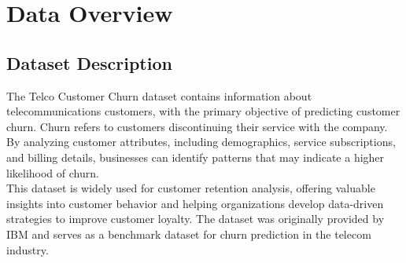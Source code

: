 \section{Data Overview}
\subsection{Dataset Description}
The Telco Customer Churn dataset contains information about telecommunications customers, with the primary objective of predicting customer churn. Churn refers to customers discontinuing their service with the company. By analyzing customer attributes, including demographics, service subscriptions, and billing details, businesses can identify patterns that may indicate a higher likelihood of churn.\\

This dataset is widely used for customer retention analysis, offering valuable insights into customer behavior and helping organizations develop data-driven strategies to improve customer loyalty. The dataset was originally provided by IBM and serves as a benchmark dataset for churn prediction in the telecom industry.

